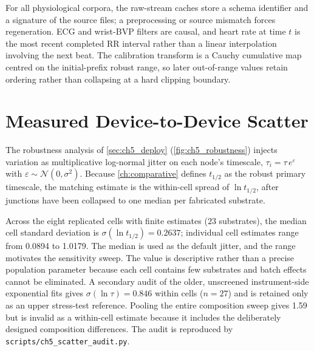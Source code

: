 For all physiological corpora, the raw-stream caches store a schema identifier and
a signature of the source files; a preprocessing or source mismatch forces
regeneration. ECG and wrist-BVP filters are causal, and heart rate at time $t$ is
the most recent completed RR interval rather than a linear interpolation involving
the next beat. The calibration transform is a Cauchy cumulative map centred on the
initial-prefix robust range, so later out-of-range values retain ordering rather
than collapsing at a hard clipping boundary.

\section{Measured Device-to-Device Scatter}\label{app:ch5_scatter}

The robustness analysis of \cref{sec:ch5_deploy} (\cref{fig:ch5_robustness}) injects variation as multiplicative log-normal jitter on each node's timescale, \(\tau_i=\tau\,e^{\varepsilon}\) with \(\varepsilon\sim\mathcal{N}(0,\sigma^2)\). Because \cref{ch:comparative} defines $t_{1/2}$ as the robust primary timescale, the matching estimate is the within-cell spread of \(\ln t_{1/2}\), after junctions have been collapsed to one median per fabricated substrate.

Across the eight replicated cells with finite estimates ($23$ substrates), the median cell standard deviation is \(\sigma(\ln t_{1/2})=\num{0.2637}\); individual cell estimates range from \num{0.0894} to \num{1.0179}. The median is used as the default jitter, and the range motivates the sensitivity sweep. The value is descriptive rather than a precise population parameter because each cell contains few substrates and batch effects cannot be eliminated. A secondary audit of the older, unscreened instrument-side exponential fits gives \(\sigma(\ln\tau)=\num{0.846}\) within cells ($n=27$) and is retained only as an upper stress-test reference. Pooling the entire composition sweep gives \num{1.59} but is invalid as a within-cell estimate because it includes the deliberately designed composition differences. The audit is reproduced by \texttt{scripts/ch5\_scatter\_audit.py}.

